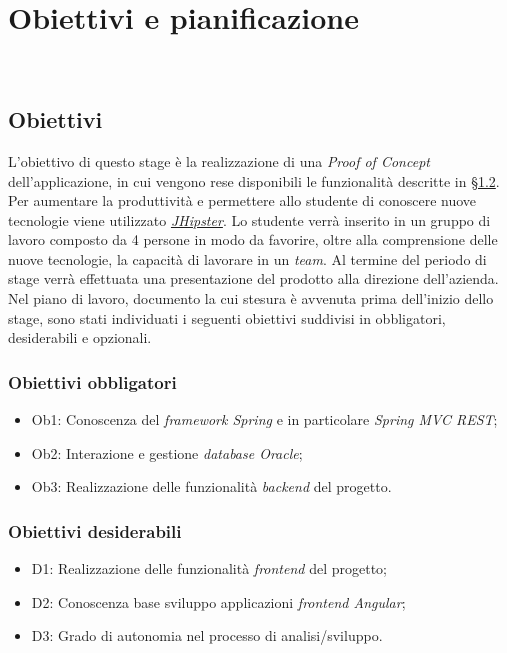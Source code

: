 
\chapter{Obiettivi e pianificazione}
\label{cap:obiettivi-pianificazione}

\\

\section{Obiettivi}
L'obiettivo di questo stage è la realizzazione di una \textit{Proof of Concept} dell'applicazione, in cui vengono rese disponibili le funzionalità descritte in \hyperref[sez:scopo]{§1.2}. Per aumentare la produttività e permettere allo studente di conoscere nuove tecnologie viene utilizzato \textit{\hyperref[jhi]{JHipster}}. Lo studente verrà inserito in un gruppo di lavoro composto da 4 persone in modo da favorire, oltre alla comprensione delle nuove tecnologie, la capacità di lavorare in un \textit{team}.
Al termine del periodo di stage verrà effettuata una presentazione del prodotto alla direzione dell'azienda.
\\Nel piano di lavoro, documento la cui stesura è avvenuta prima dell'inizio dello stage, sono stati individuati i seguenti obiettivi suddivisi in obbligatori, desiderabili e opzionali.
\subsection{Obiettivi obbligatori}
\begin{itemize}
    \item Ob1: Conoscenza del \textit{framework Spring} e in particolare \textit{Spring MVC REST};
    \item Ob2: Interazione e gestione \textit{database Oracle};
    \item Ob3: Realizzazione delle funzionalità \textit{backend} del progetto.
\end{itemize}
\subsection{Obiettivi desiderabili}
\begin{itemize}
    \item D1: Realizzazione delle funzionalità \textit{frontend} del progetto;
    \item D2: Conoscenza base sviluppo applicazioni \textit{frontend Angular};
    \item D3: Grado di autonomia nel processo di analisi/sviluppo.
\end{itemize}

